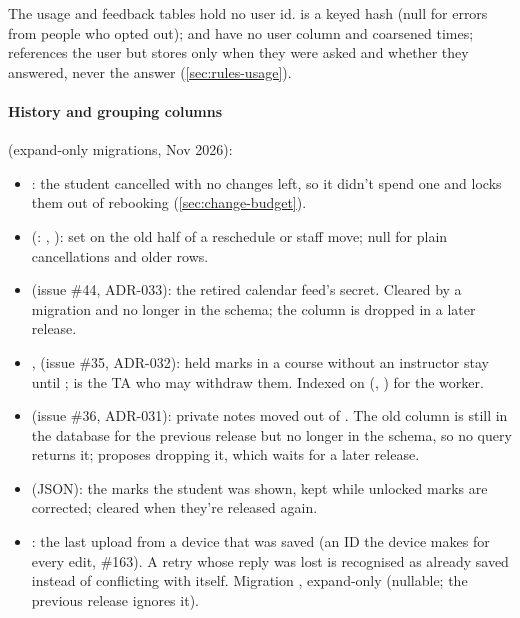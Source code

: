 \begin{note}
  The usage and feedback tables hold no user id.  is a keyed hash
  (null for errors from people who opted out);  and  have no
  user column and coarsened times;  references the user but stores only when
  they were asked and whether they answered, never the answer (\cref{sec:rules-usage}).
\end{note}

\paragraph{History and grouping columns} (expand-only migrations, Nov 2026):
\begin{itemize}
  \item {}: the student cancelled with no changes left, so it didn't spend one and locks them out of rebooking (\cref{sec:change-budget}).
  \item {} (: , ): set on the old half of a reschedule or staff move; null for plain cancellations and older rows.
  \item {} (issue \#44, ADR-033): the retired calendar feed's secret. Cleared by a migration and no longer in the schema; the column is dropped in a later release.
  \item {},  (issue \#35, ADR-032): held marks in a course without an instructor stay  until ;  is the TA who may withdraw them. Indexed on (, ) for the worker.
  \item {} (issue \#36, ADR-031): private notes moved out of . The old  column is still in the database for the previous release but no longer in the schema, so no query returns it;  proposes dropping it, which waits for a later release.
  \item {} (JSON): the marks the student was shown, kept while unlocked marks are corrected; cleared when they're released again.
  \item {}: the last upload from a device that was saved (an ID the device makes for every edit, \#163). A retry whose reply was lost is recognised as already saved instead of conflicting with itself. Migration , expand-only (nullable; the previous release ignores it).

\end{itemize}
